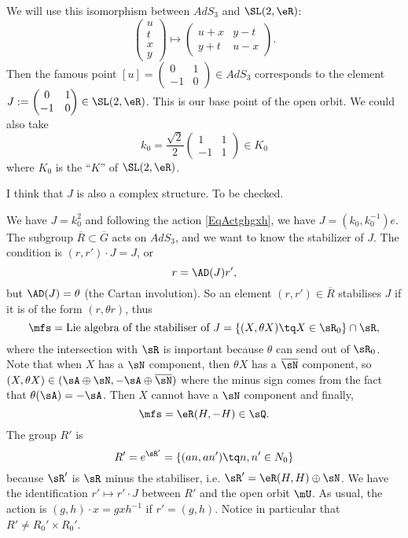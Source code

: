 We will use this isomorphism between $AdS_3$ and $\SL(2,\eR)$:
\[ 
  \begin{pmatrix}
u\\t\\x\\y
\end{pmatrix}\mapsto
\begin{pmatrix}
u+x&y-t\\y+t&u-x
\end{pmatrix}.
\]
Then the famous point $[u]=\begin{pmatrix}
0&1\\-1&0
\end{pmatrix}\in AdS_3$ corresponds to the element $J:=\begin{pmatrix}
0&1\\-1&0
\end{pmatrix}\in \SL(2,\eR)$. This is our base point of the open orbit. We could also take
\[ 
  k_{0}=\frac{ \sqrt 2 }{ 2 }\begin{pmatrix}
1&1\\-1&1
\end{pmatrix}\in K_{0}
\]
where $K_{0}$ is the ``$K$'' of $\SL(2,\eR)$. 
\begin{probleme}
    I think that $J$ is also a complex structure. To be checked.
\end{probleme}
We have $J=k_{0}^{2}$ and following the action \eqref{EqActghgxh}, we have $J=(k_{0},k_{0}^{-1})e$. The subgroup $\overline{R}\subset\overline{G}$ acts on $AdS_3$, and we want to know the stabilizer of $J$. The condition is $(r,r')\cdot J=J$, or
\[ 
  r=\AD(J)r',
\]
but $\AD(J)=\theta$ (the Cartan involution). So an element $(r,r')\in\overline{R}$ stabilises $J$ if it is of the form $(r,\theta r)$, thus
\[ 
  \mfs=\text{Lie algebra of the stabiliser of }J=\{ (X,\theta X)\tq X\in\sR_{0} \}\cap\sR,
\]
where the intersection with $\sR$ is important because $\theta$ can send out of $\sR_{0}$. Note that when $X$ has a $\sN$ component, then $\theta X$ has a $\overline{ \sN }$ component, so $(X,\theta X)\in(\sA\oplus\sN,-\sA\oplus\overline{ \sN })$ where the minus sign comes from the fact that $\theta(\sA)=-\sA$. Then $X$ cannot have a $\sN$ component and finally,
\[ 
  \mfs=\eR (H,-H)\in\sQ.
\]
The group $R'$ is
\begin{equation}
R'= e^{\sR'}=\{ (an,an')\tq n,n'\in N_{0} \}
\end{equation}
because $\sR'$ is $\sR$ minus the stabiliser, i.e. $\sR'=\eR(H,H)\oplus\sN$. We have the identification $r'\mapsto r'\cdot J$ between $R'$ and the open orbit $\mU$. As usual, the action is $(g,h)\cdot x=gxh^{-1}$ if $r'=(g,h)$. Notice in particular that $R'\neq R_{0}'\times R_{0}'$.

